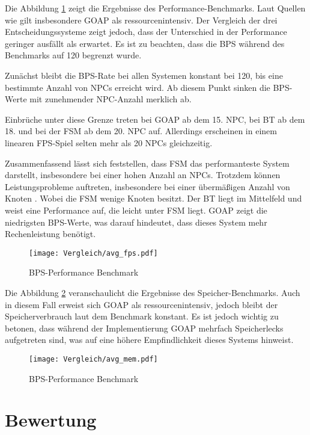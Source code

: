 Die Abbildung \ref{fig:bps benchmark} zeigt die Ergebnisse des Performance-Benchmarks. Laut Quellen wie \autocite{aiag} gilt insbesondere GOAP als ressourcenintensiv. Der Vergleich der drei Entscheidungssysteme zeigt jedoch, dass der Unterschied in der Performance geringer ausf\"{a}llt als erwartet. Es ist zu beachten, dass die BPS w\"{a}hrend des Benchmarks auf 120 begrenzt wurde. 

Zun\"{a}chst bleibt die BPS-Rate bei allen Systemen konstant bei 120, bis eine bestimmte Anzahl von NPCs erreicht wird. Ab diesem Punkt sinken die BPS-Werte mit zunehmender NPC-Anzahl merklich ab.

Einbr\"{u}che unter diese Grenze treten bei GOAP ab dem 15. NPC, bei BT ab dem 18. und bei der FSM ab dem 20. NPC auf. Allerdings erscheinen in einem linearen FPS-Spiel selten mehr als 20 NPCs gleichzeitig. 

Zusammenfassend l\"{a}sst sich feststellen, dass FSM das performanteste System darstellt, insbesondere bei einer hohen Anzahl an NPCs. Trotzdem k\"{o}nnen Leistungsprobleme auftreten, insbesondere bei einer \"{u}berm\"{a}\ss{}igen Anzahl von Knoten \autocite{U2023}. Wobei die FSM wenige Knoten besitzt. Der BT liegt im Mittelfeld und weist eine Performance auf, die leicht unter FSM liegt. GOAP zeigt die niedrigsten BPS-Werte, was darauf hindeutet, dass dieses System mehr Rechenleistung ben\"{o}tigt.

\begin{figure}[h]
  \centering
  \texttt{[image: Vergleich/avg\_fps.pdf]}
	\captionsetup{justification=justified, format=plain}
  \caption{BPS-Performance Benchmark}
  \label{fig:bps benchmark}
\end{figure}

Die Abbildung \ref{fig:mem benchmark} veranschaulicht die Ergebnisse des Speicher-Benchmarks. Auch in diesem Fall erweist sich GOAP als ressourcenintensiv, jedoch bleibt der Speicherverbrauch laut dem Benchmark konstant. Es ist jedoch wichtig zu betonen, dass w\"{a}hrend der Implementierung GOAP mehrfach Speicherlecks aufgetreten sind, was auf eine h\"{o}here Empfindlichkeit dieses Systems hinweist.

\begin{figure}[h]
  \centering
  \texttt{[image: Vergleich/avg\_mem.pdf]}
	\captionsetup{justification=justified, format=plain}
  \caption{BPS-Performance Benchmark}
  \label{fig:mem benchmark}
\end{figure}

\section{Bewertung}
\label{chap:bewertung}

